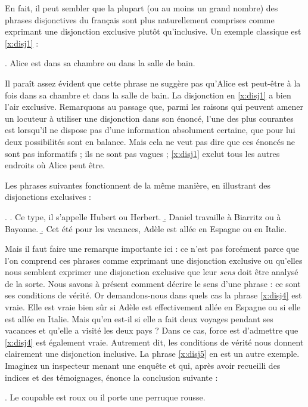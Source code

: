En fait, il peut sembler que la plupart (ou au moins un grand nombre)
des phrases disjonctives du français sont plus naturellement comprises
comme exprimant une
disjonction exclusive plutôt qu'inclusive.  Un exemple classique est
\ref{x:disj1} :

\ex.  \label{x:disj1}
Alice est dans sa chambre ou dans la salle de bain.


Il paraît assez évident que cette phrase ne suggère pas qu'Alice est
peut-être à la fois dans sa chambre et dans la salle de bain.  La
disjonction en \ref{x:disj1} a bien l'air exclusive.  
Remarquons au passage que, parmi les raisons qui peuvent amener un
locuteur à utiliser une disjonction dans son énoncé, l'une des plus
courantes est lorsqu'il ne dispose pas d'une information absolument
certaine, que pour lui deux possibilités sont en balance.  Mais cela
ne veut pas dire que ces énoncés ne sont pas informatifs ; ils ne sont
pas vagues ; \ref{x:disj1} exclut tous les autres endroits où Alice
peut être.

Les phrases suivantes fonctionnent de la même manière, en illustrant
des disjonctions exclusives :

\ex.  
\a. 
Ce type, il s'appelle Hubert ou Herbert.\label{x:disj2}
\b.  
Daniel travaille à Biarritz ou à Bayonne. \label{x:disj3}
\b.  
Cet été pour les vacances, Adèle est allée en Espagne ou en Italie.\label{x:disj4}


Mais il faut faire une remarque importante ici : ce n'est pas forcément
parce que l'on comprend ces phrases comme exprimant une disjonction
exclusive ou qu'elles nous semblent exprimer une disjonction exclusive
que leur \emph{sens} doit être analysé de la sorte.  Nous savons à
présent comment décrire le sens d'une phrase : ce sont ses conditions
de vérité.  Or demandons-nous dans quels cas la phrase \ref{x:disj4}
est vraie.  Elle est vraie bien sûr si Adèle est effectivement allée
en Espagne ou si elle est allée en Italie.  Mais qu'en est-il si elle
a fait deux voyages pendant ses vacances et qu'elle a visité les deux
pays ?  Dans ce cas, force est d'admettre que \ref{x:disj4} est
également vraie.  Autrement dit, les conditions de vérité nous donnent
clairement une disjonction inclusive.  La phrase \ref{x:disj5} en
est un autre exemple.  Imaginez un inspecteur menant une enquête et
qui, après avoir recueilli des indices et des témoignages, énonce la
conclusion suivante :

\ex. \label{x:disj5}
Le coupable est roux ou il porte une perruque rousse.


